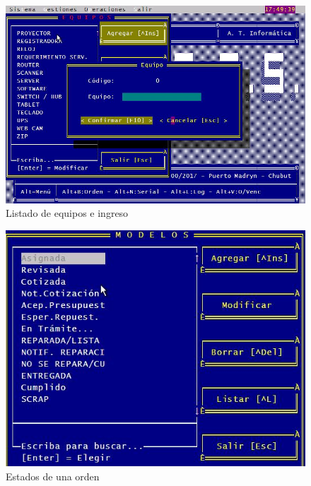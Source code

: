 \documentclass[12pt]{extarticle}
\begin{document}
    \begin{figure}[h]
    \includegraphics[scale=0.5]{images/equipo_e_ingreso.jpg}
    \caption{Listado de equipos e ingreso}
    \end{figure}

    \begin{figure}[h]
    \includegraphics[scale=0.5]{images/estados_orden.jpg}
    \caption{Estados de una orden}
    \end{figure}
\end{document}
